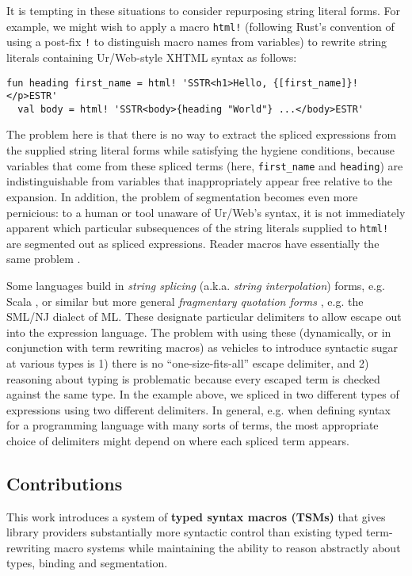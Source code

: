 \documentclass[acmlarge,review,anonymous]{acmart}\settopmatter{printfolios=true}
\newcommand{\li}[1]{\lstinline{#1}}
\begin{document}
It is tempting in these situations to consider repurposing string literal forms. For example, we might wish to apply a macro \li{html!} (following Rust's convention of using a post-fix \li{!} to distinguish macro names from variables) to rewrite string literals containing Ur/Web-style XHTML syntax as follows:
\begin{lstlisting}[numbers=none]
  fun heading first_name = html! 'SSTR<h1>Hello, {[first_name]}!</p>ESTR'
  val body = html! 'SSTR<body>{heading "World"} ...</body>ESTR'
\end{lstlisting}

The problem here is that there is no way to extract the spliced expressions from the supplied string literal forms while satisfying the hygiene conditions, because variables that come from these spliced terms (here, \li{first_name} and \li{heading}) are indistinguishable from variables that inappropriately appear free relative to the expansion. In addition, the problem of segmentation becomes even more pernicious: to a human or tool unaware of Ur/Web's syntax, it is not immediately apparent which particular subsequences of the string literals supplied to \li{html!} are segmented out as spliced expressions. Reader macros have essentially the same problem  \cite{DBLP:journals/jfp/FlattCDF12}.

  Some languages build in \emph{string splicing} (a.k.a. \emph{string interpolation}) forms, e.g. Scala \cite{odersky2008programming}, or similar but more general \emph{fragmentary quotation forms} \cite{conf/icfp/Slind91}, e.g. the SML/NJ dialect of ML. These designate particular delimiters to allow escape out into the expression language. The problem with using these (dynamically, or in conjunction with term rewriting macros) as vehicles to introduce syntactic sugar at various types is 1) there is no ``one-size-fits-all'' escape delimiter, and 2) reasoning about typing is problematic because every escaped term is checked against the same type. In the example above, we spliced in two different types of expressions using two different delimiters. In general, e.g. when defining syntax for a programming language with many sorts of terms, the most appropriate choice of delimiters might depend on where each spliced term appears.


\subsection{Contributions}
This work introduces a system of \textbf{typed syntax macros (TSMs)} that gives library providers substantially more syntactic control than existing typed term-rewriting macro systems while maintaining the ability to reason abstractly about types, binding and segmentation.%
\end{document}

